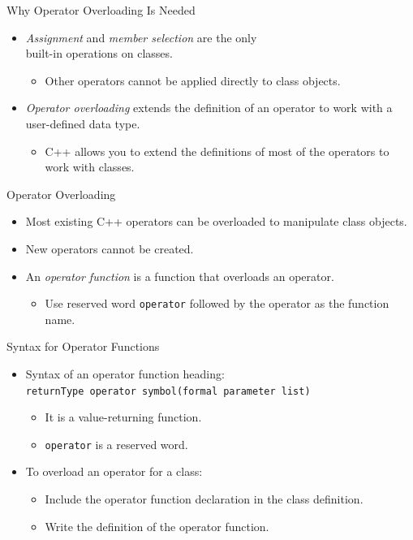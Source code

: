 \documentclass[14pt,aspectratio=1610, hyperref={pdfpagelayout=SinglePage}]{beamer}
\begin{document}
\begin{frame}{Why Operator Overloading Is Needed}
\protect\hypertarget{why-operator-overloading-is-needed-2-of-2}{}
\begin{itemize}
\item
  \textit{Assignment} and \textit{member selection} are the only \\built-in operations on
  classes.
  \begin{itemize}
  \item
    Other operators cannot be applied directly to class objects.
  \end{itemize}
\item
  \emph{Operator overloading} extends the definition of an operator to
  work with a user-defined data type.
  \begin{itemize}
  \item
    C++ allows you to extend the definitions of most of the operators to
    work with classes.
  \end{itemize}
\end{itemize}
\end{frame}

\begin{frame}[fragile]{Operator Overloading}
\protect\hypertarget{operator-overloading}{}
\begin{itemize}
\item
  Most existing C++ operators can be overloaded to manipulate class
  objects.
\item
  New operators cannot be created.
\item
  An \emph{operator function} is a function that overloads an operator.
  \begin{itemize}
  \item
    Use reserved word \lstinline{operator} followed by the operator as
    the function name.
  \end{itemize}
\end{itemize}
\end{frame}

\begin{frame}[fragile]{Syntax for Operator Functions}
\protect\hypertarget{syntax-for-operator-functions}{}
\begin{itemize}
\item
  Syntax of an operator function heading:\\
  \lstinline{returnType operator symbol(formal parameter list)}
  \begin{itemize}
  \item
    It is a value-returning function.
  \item
    \lstinline{operator} is a reserved word.
  \end{itemize}
\item
  To overload an operator for a class:
  \begin{itemize}
  \item
    Include the operator function declaration in the class definition.
  \item
    Write the definition of the operator function.
  \end{itemize}
\end{itemize}
\end{frame}
\end{document}
